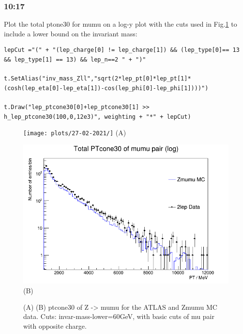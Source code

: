 \subsubsection*{10:17}
Plot the total ptone30 for mumu on a log-y plot
with the cuts used in Fig.\ref{fig:stack-Zmumu-fast_(invar-mass-lower=60GeV)_27-02-21_10-19} to include a lower bound on the invariant mass:
\begin{lstlisting}
lepCut ="(" + "(lep_charge[0] != lep_charge[1]) && (lep_type[0]== 13 && lep_type[1] == 13) && lep_n==2 " + ")"
    
t.SetAlias("inv_mass_Zll","sqrt(2*lep_pt[0]*lep_pt[1]*(cosh(lep_eta[0]-lep_eta[1])-cos(lep_phi[0]-lep_phi[1])))")

t.Draw("lep_ptcone30[0]+lep_ptcone30[1] >> h_lep_ptcone30(100,0,12e3)", weighting + "*" + lepCut)
\end{lstlisting}
\begin{figure}[h!]
    \centering
    \begin{minipage}{0.5\textwidth}
        \centering
        \texttt{[image: plots/27-02-2021/]}
        (A)
    \end{minipage}\hfill
    \begin{minipage}{0.5\textwidth}
        \centering
        \includegraphics[width=\linewidth]{plots/27-02-2021/2-stack-Zmumu-fast_(invar-mass-lower=60GeV)_27-02-21_10-19.png}
        (B)
    \end{minipage}
    \caption{(A)  (B) ptcone30 of Z -> mumu for the ATLAS and Zmumu MC data. Cuts: invar-mass-lower=60GeV, with basic cuts of mu pair with opposite charge.}
    \label{fig:stack-Zmumu-fast_(invar-mass-lower=60GeV)_27-02-21_10-19}
\end{figure}


